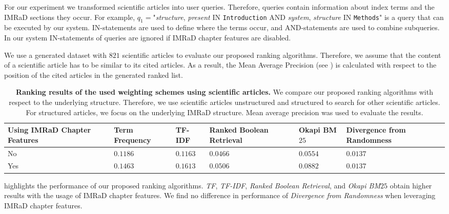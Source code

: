 For our experiment we transformed scientific articles into user queries. Therefore, queries contain information about index terms and the IMRaD sections they occur. For example, $q_1=$"\textit{structure}, \textit{present} IN \texttt{Introduction} AND \textit{system}, \textit{structure} IN \texttt{Methods}" is a query that can be executed by our system. IN-statements are used to define where the terms occur, and AND-statements are used to combine subqueries. In our system IN-statements of queries are ignored if IMRaD chapter features are disabled.

We use a generated dataset with $821$ scientific articles to evaluate our proposed ranking algorithms. Therefore, we assume that the content of a scientific article has to be similar to its cited articles. As a result, the Mean Average Precision (see ) is calculated with respect to the position of the cited articles in the generated ranked list.

\begin{table}[b!]
    \centering
    \begin{tabular}{ C{2.1cm} C{2.1cm} C{2.1cm} C{2.1cm} C{2.1cm} C{2.1cm} }
      \toprule
      \textbf{Using IMRaD Chapter Features} & \textbf{Term Frequency} & \textbf{TF-IDF} & \textbf{Ranked Boolean Retrieval} & \textbf{Okapi BM$25$} & \textbf{Divergence from Randomness} \\ \midrule
      No  & $0.1186$ & $0.1163$ & $0.0466$ & $0.0554$ & $0.0137$ \\
      Yes & $0.1463$ & $0.1613$ & $0.0506$ & $0.0882$ & $0.0137$ \\
      \bottomrule
    \end{tabular}
  \caption[Ranking results using scientific articles]{\textbf{Ranking results of the used weighting schemes using scientific articles.} We compare our proposed ranking algorithms with respect to the underlying structure. Therefore, we use scientific articles unstructured and structured to search for other scientific articles. For structured articles, we focus on the underlying IMRaD structure. Mean average precision was used to evaluate the results.}
  \label{tbl:ranking_result_full}
\end{table}

 highlights the performance of our proposed ranking algorithms. \textit{TF}, \textit{TF-IDF}, \textit{Ranked Boolean Retrieval}, and \textit{Okapi BM$25$} obtain higher results with the usage of IMRaD chapter features. We find no difference in performance of \textit{Divergence from Randomness} when leveraging IMRaD chapter features.

